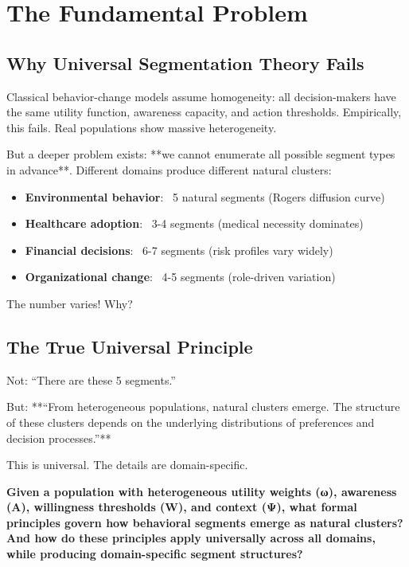 \section{The Fundamental Problem}
\label{sec:ba-fundamental}

\subsection{Why Universal Segmentation Theory Fails}

Classical behavior-change models assume homogeneity: all decision-makers have
the same utility function, awareness capacity, and action thresholds. Empirically,
this fails. Real populations show massive heterogeneity.

But a deeper problem exists: **we cannot enumerate all possible segment types
in advance**. Different domains produce different natural clusters:

\begin{itemize}
\item \textbf{Environmental behavior}: ~5 natural segments (Rogers diffusion curve)
\item \textbf{Healthcare adoption}: ~3-4 segments (medical necessity dominates)
\item \textbf{Financial decisions}: ~6-7 segments (risk profiles vary widely)
\item \textbf{Organizational change}: ~4-5 segments (role-driven variation)
\end{itemize}

The number varies! Why?

\subsection{The True Universal Principle}

Not: ``There are these 5 segments.''

But: **``From heterogeneous populations, natural clusters emerge. The structure
of these clusters depends on the underlying distributions of preferences and
decision processes.''**

This is universal. The details are domain-specific.

\begin{tcolorbox}[colback=red!5!white, colframe=red!75!black,
    title=The Fundamental Question]
\textbf{Given a population with heterogeneous utility weights (ω), awareness (A),
willingness thresholds (W), and context (Ψ), what formal principles govern how
behavioral segments emerge as natural clusters? And how do these principles
apply universally across all domains, while producing domain-specific segment
structures?}
\end{tcolorbox}

